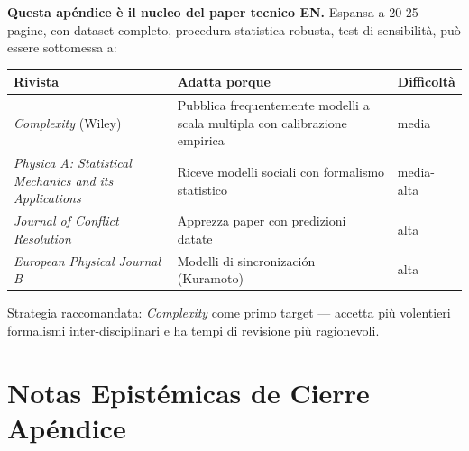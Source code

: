 \Hypoth{} \textbf{Questa apéndice è il nucleo del paper tecnico EN.}
Espansa a 20-25 pagine, con dataset completo, procedura statistica
robusta, test di sensibilità, può essere sottomessa a:

{\def\LTcaptype{none} %
{\small\begin{longtable}[]{@{}
  >{\raggedright\arraybackslash}p{}
  >{\raggedright\arraybackslash}p{}
  >{\raggedright\arraybackslash}p{}@{}}
\toprule\noalign{}
\begin{minipage}[b]{\linewidth}\raggedright
Rivista
\end{minipage} & \begin{minipage}[b]{\linewidth}\raggedright
Adatta porque
\end{minipage} & \begin{minipage}[b]{\linewidth}\raggedright
Difficoltà
\end{minipage} \\
\midrule\noalign{}
\endhead
\bottomrule\noalign{}
\endlastfoot
\emph{Complexity} (Wiley) & Pubblica frequentemente modelli a scala
multipla con calibrazione empirica & media \\
\emph{Physica A: Statistical Mechanics and its Applications} & Riceve
modelli sociali con formalismo statistico & media-alta \\
\emph{Journal of Conflict Resolution} & Apprezza paper con predizioni
datate & alta \\
\emph{European Physical Journal B} & Modelli di sincronización
(Kuramoto) & alta \\
\end{longtable}}
}

Strategia raccomandata: \emph{Complexity} come primo target --- accetta
più volentieri formalismi inter-disciplinari e ha tempi di revisione più
ragionevoli.



\section{Notas Epistémicas de Cierre
Apéndice}\label{note-epistemiche-di-chiusura-apéndice}

